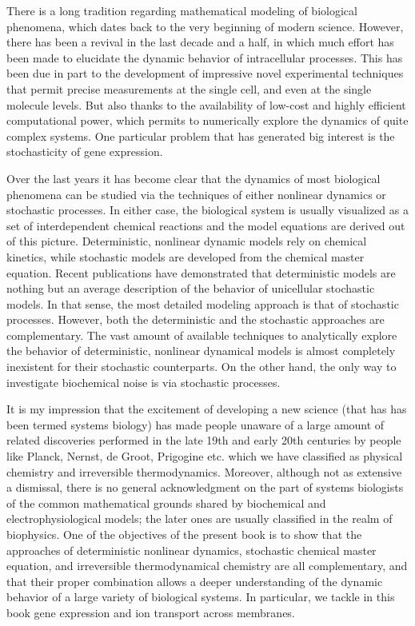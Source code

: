 %
%

\preface

There is a long tradition regarding mathematical modeling of biological phenomena, which dates back to the very beginning of modern science. However, there has been a revival in the last decade and a half,  in which much effort has been made to elucidate the dynamic behavior of intracellular processes. This has been due in part to the development of impressive novel experimental techniques that permit precise measurements at the single cell, and even at the single molecule levels. But also thanks to the availability of low-cost and highly efficient computational power, which permits to numerically explore the dynamics of quite complex systems. One particular problem that has generated big interest is the stochasticity of gene expression. 

Over the last years it has become clear that the dynamics of most biological phenomena can be studied via the techniques of either nonlinear dynamics or stochastic processes. In either case, the biological system is usually visualized as a set of interdependent chemical reactions and the model equations are derived out of this picture. Deterministic, nonlinear dynamic models rely on chemical kinetics, while stochastic models are developed from the chemical master equation. Recent publications have demonstrated that deterministic models are nothing but an average description of the behavior of unicellular stochastic models. In that sense, the most detailed modeling approach is that of stochastic processes. However, both the deterministic and the stochastic approaches are complementary. The vast amount of available techniques to analytically explore the behavior of deterministic, nonlinear dynamical models is almost completely inexistent for their stochastic counterparts. On the other hand, the only way to investigate biochemical noise is via stochastic processes.

It is my impression that the excitement of developing a new science (that has has been termed systems biology) has made people unaware of a large amount of related discoveries performed in the late 19th and early 20th centuries by people like Planck, Nernst, de Groot, Prigogine etc. which we have classified as physical chemistry and irreversible thermodynamics. Moreover, although not as extensive a dismissal, there is no general acknowledgment on the part of systems biologists of the common mathematical grounds shared by biochemical and electrophysiological models; the later ones are usually classified in the realm of biophysics. One of the objectives of the present book is to show that the approaches of deterministic nonlinear dynamics, stochastic chemical master equation, and irreversible thermodynamical chemistry are all complementary, and that their proper combination allows a deeper understanding of the dynamic behavior of a large variety of biological systems. In particular, we tackle in this book gene expression and ion transport across membranes.

